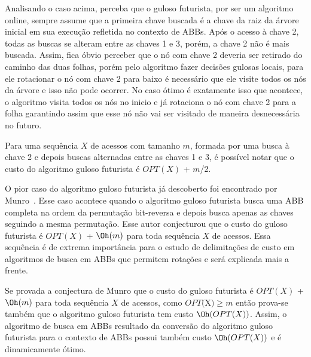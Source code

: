 Analisando o caso acima, perceba que o guloso futurista, por ser um algoritmo online, sempre assume que a primeira chave buscada é a chave da raiz da árvore inicial em sua execução refletida no contexto de ABBs. Após o acesso à chave 2, todas as buscas se alteram entre as chaves 1 e 3, porém, a chave 2 não é mais buscada. Assim, fica óbvio perceber que o nó com chave 2 deveria ser retirado do caminho das duas folhas, porém pelo algoritmo fazer decisões gulosas locais, para ele rotacionar o nó com chave 2 para baixo é necessário que ele visite todos os nós da árvore e isso não pode ocorrer. No caso ótimo é exatamente isso que acontece, o algoritmo visita todos os nós no inicio e já rotaciona o nó com chave 2 para a folha garantindo assim que esse nó não vai ser visitado de maneira desnecessária no futuro.

Para uma sequência $X$ de acessos com tamanho $m$, formada por uma busca à chave 2 e depois buscas alternadas entre as chaves 1 e 3, é possível notar que o custo do algoritmo guloso futurista é $OPT(X)$ + $m$/2.

O pior caso do algoritmo guloso futurista já descoberto foi encontrado por Munro~\cite{munro}. Esse caso acontece quando o algoritmo guloso futurista busca uma ABB completa na ordem da permutação bit-reversa e depois busca apenas as chaves seguindo a mesma permutação. Esse autor conjecturou que o custo do guloso futurista é $OPT(X)$ + $\Oh(m)$ para toda sequência $X$ de acessos. Essa sequência é de extrema importância para o estudo de delimitações de custo em algoritmos de busca em ABBs que permitem rotações e será explicada mais a frente.

Se provada a conjectura de Munro que o custo do guloso futurista é $OPT(X)$ + $\Oh(m)$ para toda sequência $X$ de acessos, como $OPT($X$) \geq m$ então prova-se também que o algoritmo guloso futurista tem custo $\Oh(OPT(X))$. Assim, o algoritmo de busca em ABBs resultado da conversão do algoritmo guloso futurista para o contexto de ABBs possui também custo $\Oh(OPT(X))$ e é dinamicamente ótimo.